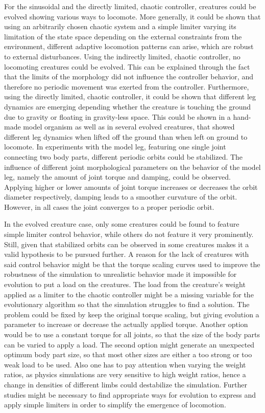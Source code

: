 \documentclass[main]{subfiles}
\begin{document}
%
For the sinusoidal and the directly limited, chaotic controller, creatures could be evolved showing various ways to locomote. %
%
More generally, it could be shown that using an arbitrarily chosen chaotic system and a simple limiter varying its limitation of the state space depending on the external constraints from the environment, different adaptive locomotion patterns can arise, which are robust to external disturbances. %
%
Using the indirectly limited, chaotic controller, no locomoting creatures could be evolved. %
%
This can be explained through the fact that the limits of the morphology did not influence the controller behavior, and therefore no periodic movement was exerted from the controller. %
%
Furthermore, using the directly limited, chaotic controller, it could be shown that different leg dynamics are emerging depending whether the creature is touching the ground due to gravity or floating in gravity-less space. %
%
This could be shown in a hand-made model organism as well as in several evolved creatures, that showed different leg dynamics when lifted off the ground than when left on ground to locomote. %
%
In experiments with the model leg, featuring one single joint connecting two body parts, different periodic orbits could be stabilized. %
%
The influence of different joint morphological parameters on the behavior of the model leg, namely the amount of joint torque and damping, could be observed. %
%
Applying higher or lower amounts of joint torque increases or decreases the orbit diameter respectively, damping leads to a smoother curvature of the orbit. %
%
However, in all cases the joint converges to a proper periodic orbit.

In the evolved creature case, only some creatures could be found to feature simple limiter control behavior, while others do not feature it very prominently. %
%
Still, given that stabilized orbits can be observed in some creatures makes it a valid hypothesis to be pursued further.
%
A reason for the lack of creatures with said control behavior might be that the torque scaling curves used to improve the robustness of the simulation to unrealistic behavior made it impossible for evolution to put a load on the creatures. %
%
The load from the creature's weight applied as a limiter to the chaotic controller might be a missing variable for the evolutionary algorithm so that the simulation struggles to find a solution. %
%
The problem could be fixed by keep the original torque scaling, but giving evolution a parameter to increase or decrease the actually applied torque. %
%
Another option would be to use a constant torque for all joints, so that the size of the body parts can be varied to apply a load. %
%
The second option might generate an unexpected optimum body part size, so that most other sizes are either a too strong or too weak load to be used. %
%
Also one has to pay attention when varying the weight ratios, as physics simulations are very sensitive to high weight ratios, hence a change in densities of different limbs could destabilize the simulation. %
%
Further studies might be necessary to find appropriate ways for evolution to express and apply simple limiters in order to simplify the emergence of locomotion.%
\end{document}
